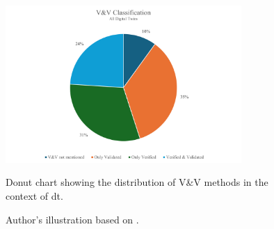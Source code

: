 \begin{figure}[htbp]
  \centering
  \includegraphics[width=0.8\textwidth]{figures/vvbitencourt.png}
  \caption[Donut Chart V\&V]{Donut chart showing the distribution of V\&V methods in the context of \gls{dt}.}
  \label{fig:vvbitencourt}
  \caption*{Author's illustration based on \textcite{Bitencourt2023}.}
\end{figure}

